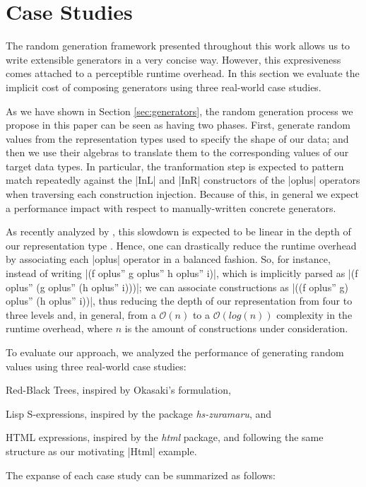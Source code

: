 \section{Case Studies}
\label{sec:casestudies}

The random generation framework presented throughout this work allows us to
write extensible generators in a very concise way.
%
However, this expresiveness comes attached to a perceptible runtime overhead.
%
In this section we evaluate the implicit cost of composing generators using
three real-world case studies.


As we have shown in Section \ref{sec:generators}, the random generation
process we propose in this paper can be seen as having two phases.
%
First, generate random values from the representation types used to specify the
shape of our data; and then we use their algebras to translate them to the
corresponding values of our target data types.
%
In particular, the tranformation step is expected to pattern match repeatedly
against the |InL| and |InR| constructors of the |oplus| operators when
traversing each construction injection.
%
Because of this, in general we expect a performance impact with respect to
manually-written concrete generators.


As recently analyzed by \citeauthor{KiriyamaOptimizingDTC}, this slowdown is
expected to be linear in the depth of our representation type
\cite{KiriyamaOptimizingDTC}.
%
Hence, one can drastically reduce the runtime overhead by associating each
|oplus| operator in a balanced fashion.
%
So, for instance, instead of writing |(f oplus'' g oplus'' h oplus'' i)|, which
is implicitly parsed as |(f oplus'' (g oplus'' (h oplus'' i)))|; we can
associate constructions as |((f oplus'' g) oplus'' (h oplus'' i))|, thus
reducing the depth of our representation from four to three levels and, in
general, from a $\mathcal{O}(n)$ to a $\mathcal{O}(log(n))$ complexity in the
runtime overhead, where $n$ is the amount of constructions under consideration.



To evaluate our approach, we analyzed the performance of generating random
values using three real-world case studies:
\begin{inparaenum}[(i)]
\item Red-Black Trees, inspired by Okasaki's formulation,
\item Lisp S-expressions, inspired by the package \emph{hs-zuramaru}, and
\item HTML expressions, inspired by the \emph{html} package, and following the
  same structure as our motivating |Html| example.
\end{inparaenum}
%
The expanse of each case study can be summarized as follows:

